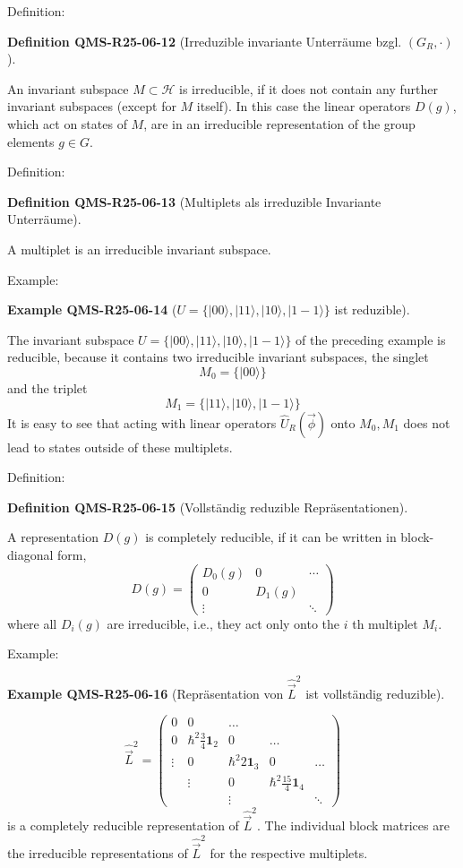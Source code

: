 \documentclass[10pt, letterpaper]{article}
\newcommand{\CustomHeading}[3]{%
  \par\medskip\noindent%
  \textbf{#1 #2} \textnormal{(#3)}.\enskip%
}
\newenvironment{DEF}[2]{\begin{unitbox}\CustomHeading{Definition}{#1}{#2}}{\end{unitbox}}
\newenvironment{EXA}[2]{\begin{unitbox}\CustomHeading{Example}{#1}{#2}}{\end{unitbox}}
\begin{document}
Definition: 

\begin{DEF}{QMS-R25-06-12}{Irreduzible invariante Unterräume bzgl. $(G_{R}, \cdot)$}
An invariant subspace $M \subset \mathcal{H}$ is irreducible, if it does not contain any further invariant subspaces (except for $M$ itself). In this case the linear operators $D(g)$, which act on states of $M$, are in an irreducible representation of the group elements $g \in G$.
\end{DEF}


Definition: 

\begin{DEF}{QMS-R25-06-13}{Multiplets als irreduzible Invariante Unterräume}
A multiplet is an irreducible invariant subspace.
\end{DEF}

Example: 


\begin{EXA}{QMS-R25-06-14}{$U=\{|00\rangle,|11\rangle,|10\rangle,|1-1\rangle\}$ ist reduzible}
The invariant subspace $U=\{|00\rangle,|11\rangle,|10\rangle,|1-1\rangle\}$ of the preceding example is reducible, because it contains two irreducible invariant subspaces, the singlet
$$
M_{0}=\{|00\rangle\}
$$
and the triplet
$$
M_{1}=\{|11\rangle,|10\rangle,|1-1\rangle\}
$$
It is easy to see that acting with linear operators $\hat{U}_{R}(\vec{\phi})$ onto $M_{0}, M_{1}$ does not lead to states outside of these multiplets.
\end{EXA}



Definition: 



\begin{DEF}{QMS-R25-06-15}{Vollständig reduzible Repräsentationen}
A representation $D(g)$ is completely reducible, if it can be written in block-diagonal form,
$$
D(g)=\left(\begin{array}{ccc}
D_{0}(g) & 0 & \cdots \\
0 & D_{1}(g) & \\
\vdots & & \ddots
\end{array}\right)
$$
where all $D_{i}(g)$ are irreducible, i.e., they act only onto the $i$ th multiplet $M_{i}$.
\end{DEF}


Example:

\begin{EXA}{QMS-R25-06-16}{Repräsentation von $\hat{\vec{L}}^{2}$ ist vollständig reduzible}
$$
\hat{\vec{L}}^{2}=\left(\begin{array}{ccccc}
0 & 0 & \ldots & & \\
0 & \hbar^{2} \frac{3}{4} \mathbf{1}_{2} & 0 & \ldots & \\
\vdots & 0 & \hbar^{2} 2 \mathbf{1}_{3} & 0 & \ldots \\
& \vdots & 0 & \hbar^{2} \frac{15}{4} \mathbf{1}_{4} & \\
& & \vdots & & \ddots
\end{array}\right)
$$
is a completely reducible representation of $\hat{\vec{L}}^{2}$. The individual block matrices are the irreducible representations of $\hat{\vec{L}}^{2}$ for the respective multiplets.
\end{EXA}
\end{document}
